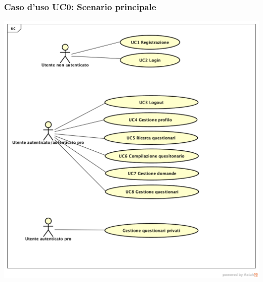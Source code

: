 \subsubsection{Caso d'uso UC0: Scenario principale}
\begin{center}
\includegraphics[scale=0.5]{UML/UC0.png}
\end{center}
